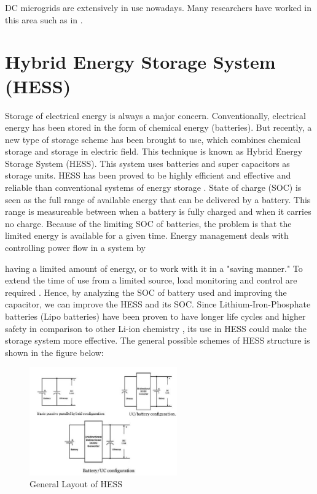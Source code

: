 \documentclass[journal,twoside]{IEEEtran}
\begin{document}
\bigskip
DC microgrids are extensively in use nowadays.
Many researchers have worked in this area such as in \cite{Chen2015, Piagi2006, Lee2015, Madduri2015, Vosoloo2050, Liu2015, Giacomini2015, Latreche2015, Yahyaoui2015}.


\section{Hybrid Energy Storage System (HESS)}
Storage of electrical energy is always a major
concern. Conventionally, electrical energy has been
stored in the form of chemical energy (batteries). But
recently, a new type of storage scheme has been
brought to use, which combines chemical storage and
storage in electric field. This technique is known as
Hybrid Energy Storage System (HESS). This system
uses batteries and super capacitors as storage units.
HESS has been proved to be highly efficient and
effective and reliable than conventional systems of
energy storage \cite{Yahyaoui2015, Ismail2013}.
State of charge (SOC) is seen as the full range
of available energy that can be delivered by a battery.
This range is measureable between when a battery is
fully charged and when it carries no charge. Because of
the limiting SOC of batteries, the problem is that the limited
energy is available for a given time. Energy management deals with controlling power flow in a system by

having a limited amount of energy, or to work with it
in a "saving manner." To extend the time of use from a
limited source, load monitoring and control are required \cite{Michaelson2050}. Hence, by analyzing the SOC of battery
used and improving the capacitor, we can improve the
HESS and its SOC.
Since Lithium-Iron-Phosphate batteries (Lipo batteries) have been proven to have longer life cycles
and higher safety in comparison to other Li-ion chemistry \cite{Lithium2050}, its use in HESS could make the storage system more effective.
The general possible schemes of HESS
structure is shown in the figure below:

\begin{figure}[!ht]
\centering
\includegraphics[width=2.5in]{3}
\caption{General Layout of HESS}
\label{f3}
\end{figure}
\end{document}
